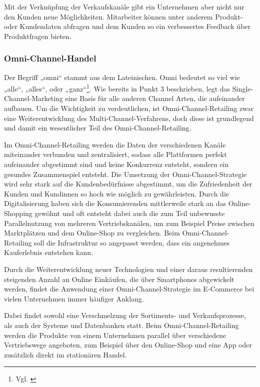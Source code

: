 Mit der Verknüpfung der Verkaufskanäle gibt ein Unternehmen aber nicht nur den Kunden neue Möglichkeiten. Mitarbeiter können unter anderem Produkt- oder Kundendaten abfragen und dem Kunden so ein verbessertes Feedback über Produktfragen bieten.


\subsubsection{Omni-Channel-Handel}\label{unterabschnitt_2_2_4}
Der Begriff „omni“ stammt aus dem Lateinischen. Omni bedeutet so viel wie „alle“, „alles“, oder „ganz“\footnote{Vgl. \autocite [Online] {Wortbedeutung.info2022}}.
\newline
Wie bereits in Punkt 3 beschrieben, legt das Single-Channel-Marketing eine Basis für alle anderen Channel Arten, die aufeinander aufbauen. Um die Wichtigkeit zu verdeutlichen, ist Omni-Channel-Retailing zwar eine Weiterentwicklung des Multi-Channel-Verfahrens, doch diese ist grundlegend und damit ein wesentlicher Teil des Omni-Channel-Retailing.
\newline

Im Omni-Channel-Retailing werden die Daten der verschiedenen Kanäle miteinander verbunden und zentralisiert, sodass alle Plattformen perfekt aufeinander abgestimmt sind und keine Konkurrenz entsteht, sondern ein gesundes Zusammenspiel entsteht.
\newline
Die Umsetzung der Omni-Channel-Strategie wird sehr stark auf die Kundenbedürfnisse abgestimmt, um die Zufriedenheit der Kunden und Kundinnen so hoch wie möglich zu gewährleisten.
\newline
Durch die Digitalisierung haben sich die Konsumierenden mittlerweile stark an das Online-Shopping gewöhnt und oft entsteht dabei auch die zum Teil unbewusste Parallelnutzung von mehreren Vertriebskanälen, um zum Beispiel Preise zwischen Marktplätzen und dem Online-Shop zu vergleichen. Beim Omni-Channel-Retailing soll die Infrastruktur so angepasst werden, dass ein angenehmes Kauferlebnis entstehen kann.
\newline

Durch die Weiterentwicklung neuer Technologien und einer daraus resultierenden steigenden Anzahl an Online Einkäufen, die über Smartphones abgewickelt werden, findet die Anwendung einer Omni-Channel-Strategie im E-Commerce bei vielen Unternehmen immer häufiger Anklang.
\newline

Dabei findet sowohl eine Verschmelzung der Sortiments- und Verkaufsprozesse, als auch der Systeme und Datenbanken statt. Beim Omni-Channel-Retailing werden die Produkte von einem Unternehmen parallel über verschiedene Vertriebswege angeboten, zum Beispiel über den Online-Shop und eine App oder zusätzlich direkt im stationären Handel.
\newline

